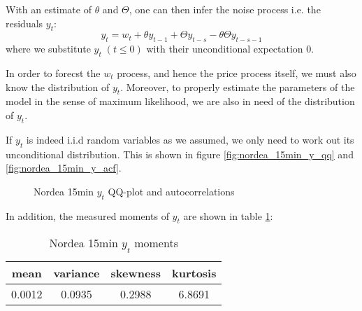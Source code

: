\documentclass{book}
\begin{document}
With an estimate of $\theta$ and $\Theta$, one can then infer the
noise process i.e. the residuals $y_t$:
\begin{equation}
  \label{eq:infer_y}
  y_t = w_t + \theta y_{t-1} + \Theta y_{t-s} - \theta \Theta y_{t-s-1}
\end{equation}
where we substitute $y_t\;(t \leq 0)$ with their unconditional
expectation 0.

In order to forecst the $w_t$ process, and hence the price process
itself, we must also know the distribution of $y_t$. Moreover, to
properly estimate the parameters of the model in the sense of maximum
likelihood, we are also in need of the distribution of $y_t$.

If $y_t$ is indeed i.i.d random variables as we assumed, we only need
to work out its unconditional distribution. This is shown in figure
\ref{fig:nordea_15min_y_qq} and \ref{fig:nordea_15min_y_acf}.
\begin{figure}[htb!]
  \centering
  \caption{\footnotesize Nordea 15min $y_t$ QQ-plot and autocorrelations}
\end{figure}
In addition, the measured moments of $y_t$ are shown in table
\ref{tab:nordea_15min_y_moments}:
\begin{table}[htb!]
  \centering
  \begin{tabular}{c|c|c|c}
    mean & variance & skewness & kurtosis \\
    \hline
    0.0012 & 0.0935 & 0.2988 & 6.8691
  \end{tabular}
  \caption{\footnotesize Nordea 15min $y_t$ moments}
  \label{tab:nordea_15min_y_moments}
\end{table}
\end{document}
